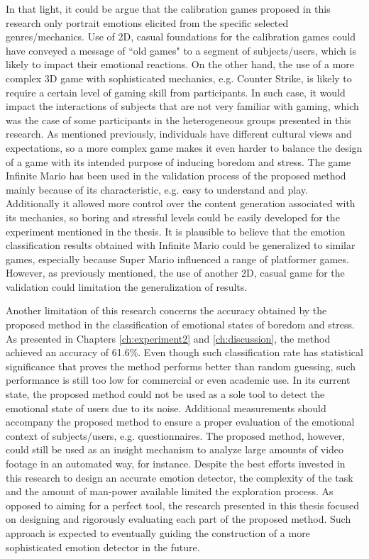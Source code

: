 In that light, it could be argue that the calibration games proposed in this research only portrait emotions elicited from the specific selected genres/mechanics. Use of 2D, casual foundations for the calibration games could have conveyed a message of ``old games" to a segment of subjects/users, which is likely to impact their emotional reactions. On the other hand, the use of a more complex 3D game with sophisticated mechanics, e.g. Counter Strike, is likely to require a certain level of gaming skill from participants. In such case, it would impact the interactions of subjects that are not very familiar with gaming, which was the case of some participants in the heterogeneous groups presented in this research. As mentioned previously, individuals have different cultural views and expectations, so a more complex game makes it even harder to balance the design of a game with its intended purpose of inducing boredom and stress. The game Infinite Mario has been used in the validation process of the proposed method mainly because of its characteristic, e.g. easy to understand and play. Additionally it allowed more control over the content generation associated with its mechanics, so boring and stressful levels could be easily developed for the experiment mentioned in the thesis. It is plausible to believe that the emotion classification results obtained with Infinite Mario could be generalized to similar games, especially because Super Mario influenced a range of platformer games. However, as previously mentioned, the use of another 2D, casual game for the validation could limitation the generalization of results.

Another limitation of this research concerns the accuracy obtained by the proposed method in the classification of emotional states of boredom and stress. As presented in Chapters \ref{ch:experiment2} and \ref{ch:discussion}, the method achieved an accuracy of 61.6\%. Even though such classification rate has statistical significance that proves the method performs better than random guessing, such performance is still too low for commercial or even academic use. In its current state, the proposed method could not be used as a sole tool to detect the emotional state of users due to its noise. Additional measurements should accompany the proposed method to ensure a proper evaluation of the emotional context of subjects/users, e.g. questionnaires. The proposed method, however, could still be used as an insight mechanism to analyze large amounts of video footage in an automated way, for instance. Despite the best efforts invested in this research to design an accurate emotion detector, the complexity of the task and the amount of man-power available limited the exploration process. As opposed to aiming for a perfect tool, the research presented in this thesis focused on designing and rigorously evaluating each part of the proposed method. Such approach is expected to eventually guiding the construction of a more sophisticated emotion detector in the future.

